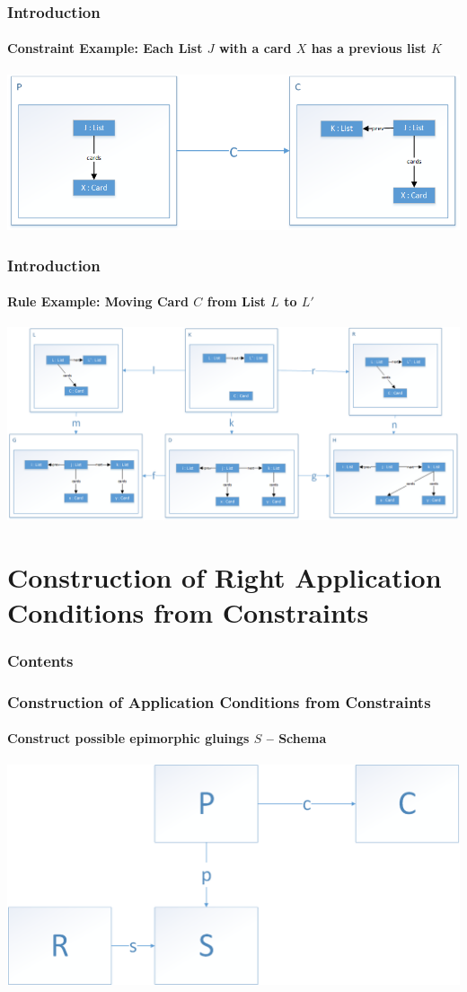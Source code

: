 \documentclass[32pt,t]{beamer}
\begin{document}
	\begin{frame}
		\frametitle{Introduction}
		\framesubtitle{Constraint Example: Each List $J$ with a card $X$ has a previous list $K$}
		\centering
		\includegraphics[width=\linewidth]{Images/01_Constraint_Example}
	\end{frame}

	\begin{frame}
		\frametitle{Introduction}
		\framesubtitle{Rule Example: Moving Card $C$ from List $L$ to $L'$}
		\centering
		\includegraphics[width=\linewidth]{Images/01_Rule_Example}
	\end{frame}

\section{Construction of Right Application Conditions from Constraints}
	\begin{frame}
		\frametitle{Contents}
		\tableofcontents[currentsection]
	\end{frame}

	\begin{frame}
		\frametitle{Construction of Application Conditions from Constraints}
		\framesubtitle{Construct possible epimorphic gluings $S$ -- Schema}
		\centering
		\includegraphics[width=\linewidth]{Images/10_Construct_S_Schema}
	\end{frame}
\end{document}

